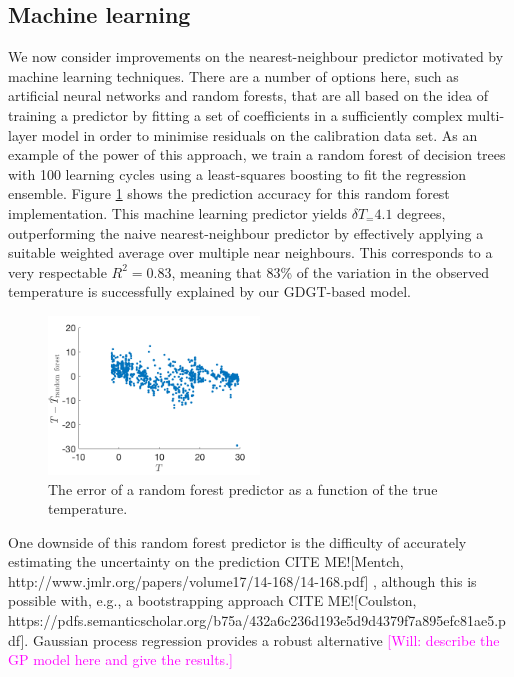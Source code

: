\documentclass[rmp,aps,twocolumn]{revtex4-1}
\newcommand{\citeme}{{\color{blue} CITE ME!}}
\newcommand{\ilya}[1]{\textcolor{magenta}{#1}}
\begin{document}
\subsection{Machine learning}

We now consider improvements on the nearest-neighbour predictor motivated by machine learning techniques.  There are a number of options here, such as artificial neural networks and random forests, that are all based on the idea of training a predictor by fitting a set of coefficients in a sufficiently complex multi-layer model in order to minimise residuals on the calibration data set.  As an example of the power of this approach, we train a random forest of decision trees with 100 learning cycles using a least-squares boosting to fit the regression ensemble.  Figure \ref{fig:randomforest} shows the prediction accuracy for this random forest implementation.  This machine learning predictor yields $\delta T_\mathrm = 4.1$ degrees, outperforming the naive nearest-neighbour predictor by effectively applying a suitable weighted average over multiple near neighbours.  This corresponds to a very respectable $R^2 = 0.83$, meaning that 83\% of the variation in the observed temperature is successfully explained by our GDGT-based model.

\begin{figure}
	\centering
	\includegraphics[width=0.5\textwidth]{Trandomforest.png}
	\caption{\label{fig:randomforest}  The error of a random forest predictor as a function of the true temperature.}
\end{figure}


One downside of this random forest predictor is the difficulty of accurately estimating the uncertainty on the prediction \citeme [Mentch, http://www.jmlr.org/papers/volume17/14-168/14-168.pdf] , although this is possible with, e.g., a bootstrapping approach \citeme [Coulston, https://pdfs.semanticscholar.org/b75a/432a6c236d193e5d9d4379f7a895efc81ae5.pdf].  Gaussian process regression provides a robust alternative 
\ilya{[Will: describe the GP model here and give the results.]}
\end{document}
